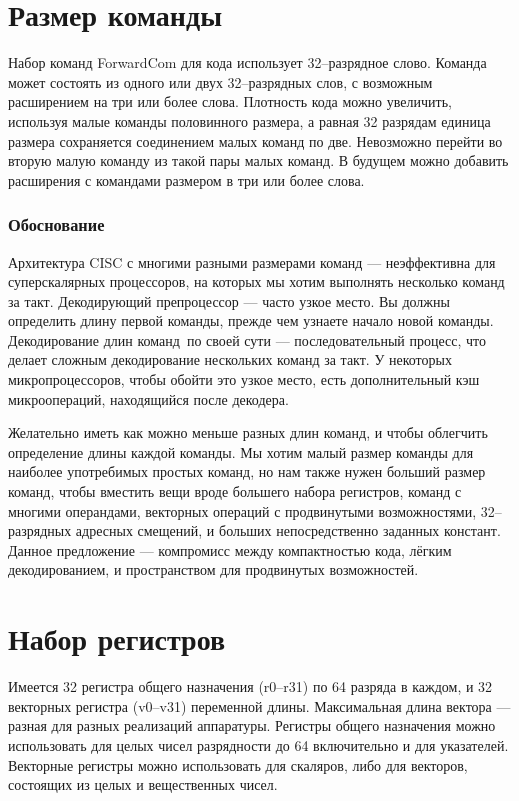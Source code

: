 \documentclass[forwardcom.tex]{subfiles}
\begin{document}
\section{Размер команды}
Набор команд ForwardCom для кода использует 32--разрядное слово. Команда может состоять из одного или двух 32--разрядных слов, с возможным расширением на три или более слова. Плотность кода можно увеличить, используя малые команды половинного размера, а равная 32 разрядам единица размера сохраняется соединением малых команд по две. Невозможно перейти во вторую малую команду из такой пары малых команд. В будущем можно добавить расширения с командами размером в три или более слова.

\subsubsection{Обоснование}
Архитектура CISC с многими разными размерами команд --- неэффективна для суперскалярных процессоров, на которых мы хотим выполнять несколько команд за такт. Декодирующий препроцессор --- часто узкое место. Вы должны определить длину первой команды, прежде чем узнаете начало новой команды. \glqq Декодирование длин команд\grqq\ по своей сути --- последовательный процесс, что делает сложным декодирование нескольких команд за такт. У некоторых микропроцессоров, чтобы обойти это узкое место, есть дополнительный \glqq кэш микроопераций\grqq, находящийся после декодера.

Желательно иметь как можно меньше разных длин команд, и чтобы облегчить определение длины каждой команды. Мы хотим малый размер команды для наиболее употребимых простых команд, но нам также нужен больший размер команд, чтобы вместить вещи вроде большего набора регистров, команд с многими операндами, векторных операций с продвинутыми возможностями, 32--разрядных адресных смещений, и больших непосредственно заданных констант. Данное предложение --- компромисс между компактностью кода, лёгким декодированием, и пространством для продвинутых возможностей.

\section{Набор регистров}
Имеется 32 регистра общего назначения (r0--r31) по 64 разряда в каждом, и 32 векторных регистра (v0--v31) переменной длины. Максимальная длина вектора --- разная для разных реализаций аппаратуры. Регистры общего назначения можно использовать для целых чисел разрядности до 64 включительно и для указателей. Векторные регистры можно использовать для скаляров, либо для векторов, состоящих из целых и вещественных чисел.
\end{document}

